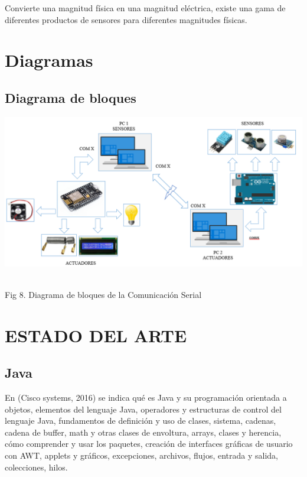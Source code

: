 \documentclass[letterpaper, 10 pt, conference]{ieeeconf}
\begin{document}
Convierte una magnitud física en una magnitud eléctrica, existe una gama de diferentes productos de sensores para diferentes magnitudes físicas.


\section{Diagramas}
\subsection{Diagrama de bloques}

 \begin{center}
\includegraphics[scale=0.3]{Documento/Figuras/fig8.PNG}
\begin{scriptsize}\\ 
Fig 8. Diagrama de bloques de la Comunicación Serial
\end{scriptsize}
\end{center}


\section{ESTADO DEL ARTE}
\subsection{Java}
En (Cisco systems, 2016) se indica qué es Java y su programación orientada a objetos, elementos del lenguaje Java, operadores y estructuras de control del lenguaje Java, fundamentos de definición y uso de clases, sistema, cadenas, cadena de buffer, math y otras clases de envoltura, arrays, clases y herencia, cómo comprender y usar los paquetes, creación de interfaces gráficas de usuario con AWT, applets y gráficos, excepciones, archivos, flujos, entrada y salida, colecciones, hilos.
\end{document}

